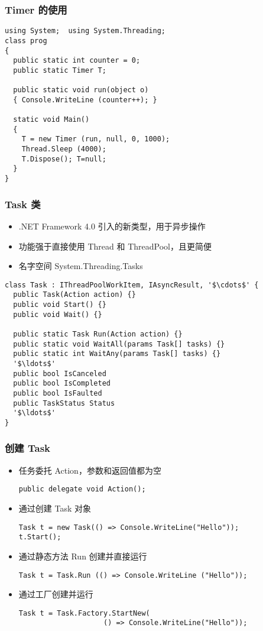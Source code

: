 \begin{frame}[fragile]
\frametitle{Timer 的使用}
\begin{lstlisting}
using System;  using System.Threading;
class prog
{
  public static int counter = 0;
  public static Timer T;

  public static void run(object o)
  { Console.WriteLine (counter++); }

  static void Main()
  {
    T = new Timer (run, null, 0, 1000);
    Thread.Sleep (4000);
    T.Dispose(); T=null;
  }
}
\end{lstlisting}
\end{frame}

\begin{frame}[fragile]
\frametitle{Task 类}
\begin{itemize}
\item .NET Framework 4.0 引入的新类型，用于异步操作
\item 功能强于直接使用 Thread 和 ThreadPool，且更简便
\item 名字空间 System.Threading.Tasks
\end{itemize}
\begin{lstlisting}[escapeinside='']
class Task : IThreadPoolWorkItem, IAsyncResult, '$\cdots$' {
  public Task(Action action) {}
  public void Start() {}
  public void Wait() {}

  public static Task Run(Action action) {}
  public static void WaitAll(params Task[] tasks) {}
  public static int WaitAny(params Task[] tasks) {}
  '$\ldots$'
  public bool IsCanceled
  public bool IsCompleted
  public bool IsFaulted
  public TaskStatus Status
  '$\ldots$'
}
\end{lstlisting}

\end{frame}

\begin{frame}[fragile]
\frametitle{创建 Task}
\begin{itemize}
\item 任务委托 Action，参数和返回值都为空
\begin{lstlisting}
public delegate void Action();
\end{lstlisting}
\item 通过创建 Task 对象
\begin{lstlisting}
Task t = new Task(() => Console.WriteLine("Hello"));
t.Start();
\end{lstlisting}
\item 通过静态方法 Run 创建并直接运行
\begin{lstlisting}
Task t = Task.Run (() => Console.WriteLine ("Hello"));
\end{lstlisting}
\item 通过工厂创建并运行
\begin{lstlisting}
Task t = Task.Factory.StartNew(
                    () => Console.WriteLine("Hello"));

\end{lstlisting}
\end{itemize}
\end{frame}


